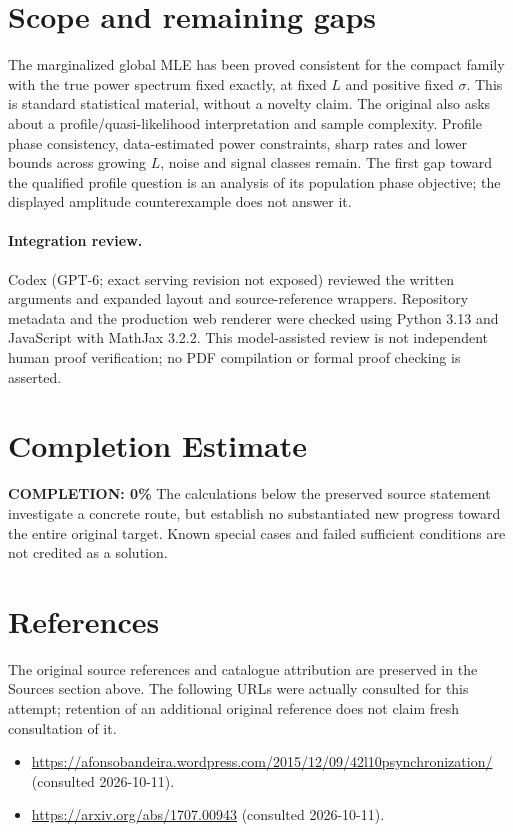 \documentclass[11pt]{article}
\begin{document}
\section{Scope and remaining gaps}
The marginalized global MLE has been proved consistent for the compact
family with the true power spectrum fixed exactly, at fixed $L$ and positive
fixed $\sigma$. This is standard statistical material, without a novelty claim.
The original also asks about a profile/quasi-likelihood interpretation and sample
complexity. Profile phase consistency, data-estimated power constraints, sharp
rates and lower bounds across growing $L$, noise and signal classes remain.
The first gap toward the qualified profile question is an analysis of its
population phase objective; the displayed amplitude counterexample does not answer it.
\paragraph{Integration review.} Codex (GPT-6; exact serving revision not exposed) reviewed the written arguments and expanded layout and source-reference wrappers. Repository metadata and the production web renderer were checked using Python 3.13 and JavaScript with MathJax 3.2.2. This model-assisted review is not independent human proof verification; no PDF compilation or formal proof checking is asserted.

\section{Completion Estimate}
\noindent\textbf{COMPLETION: 0\%}
The calculations below the preserved source statement investigate a concrete route,
but establish no substantiated new progress toward the entire original target.
Known special cases and failed sufficient conditions are not credited as a solution.
\section{References}
The original source references and catalogue attribution are preserved in the
Sources section above. The following URLs were actually consulted for this attempt;
retention of an additional original reference does not claim fresh consultation of it.
\begin{itemize}
\item \url{https://afonsobandeira.wordpress.com/2015/12/09/42l10psynchronization/} (consulted 2026-10-11). 
\item \url{https://arxiv.org/abs/1707.00943} (consulted 2026-10-11). 
\end{itemize}
\end{document}
